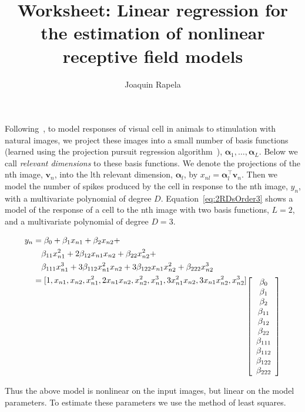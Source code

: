 \documentclass[12pt]{article}
\title{Worksheet: Linear regression for the estimation of nonlinear receptive
field models}
\author{Joaquin Rapela}
\begin{document}
\maketitle

Following~\citet{rapelaEtAl06}, to model responses of visual cell in animals to
stimulation with natural images, we
project these images into a small number of basis
functions (learned using the projection pursuit regression
algorithm~\citep{friedmanAndStuetzle81}), $\bm{\alpha}_1,\ldots,\bm{\alpha}_L$. Below we call \emph{relevant
dimensions} to these basis functions. We denote the projections of the nth
image, $\mathbf{v}_n$, into the lth relevant dimension, $\bm{\alpha}_l$, by
$x_{nl}=\bm{\alpha}_l^\intercal\mathbf{v}_n$. Then we model the number of spikes produced by the cell
in response to the nth image, $y_n$, with a multivariate polynomial of degree $D$.
Equation~\ref{eq:2RDsOrder3} shows a model of the response of
a cell to the nth image with
two basis functions, $L=2$, and a
multivariate polynomial of degree $D=3$.

\begin{align}
    y_n&=\beta_0+\beta_1x_{n1}+\beta_2x_{n2}+\nonumber\\
       &\quad\beta_{11}x_{n1}^2+2\beta_{12}x_{n1}x_{n2}+\beta_{22}x_{n2}^2+\nonumber\\
       &\quad\beta_{111}x_{n1}^3+3\beta_{112}x_{n1}^2x_{n2}+3\beta_{122}x_{n1}x_{n2}^2+\beta_{222}x_{n2}^3\nonumber\\
       &=[1,x_{n1},x_{n2},x_{n1}^2,2x_{n1}x_{n2},x_{n2}^2,x_{n1}^3,3x_{n1}^2x_{n2},3x_{n1}x_{n2}^2,x_{n2}^3]
         \raisebox{-5.6em}{$\left[\begin{array}{c}
             \beta_0\\\beta_1\\\beta_2\\\beta_{11}\\\beta_{12}\\\beta_{22}\\\beta_{111}\\\beta_{112}\\\beta_{122}\\\beta_{222}
                                \end{array}\right]$}
    \label{eq:2RDsOrder3}
\end{align}

Thus the above model is nonlinear on the input images, but linear on the
model parameters. To estimate these parameters we use the method of least squares.
\end{document}
